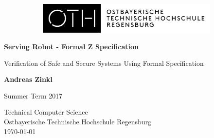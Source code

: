 \begin{titlepage}
    \begin{center}
        \vspace*{1cm}
        
        \begin{figure}[H]
			\centering
			\begin{subfigure}{\textwidth}
  				\centering
  				\includegraphics[width=0.7\linewidth]{images/OTHLogo.jpg}
  				\label{pic:OTHLogo}
			\end{subfigure}%
            \begin{subfigure}{.5\textwidth}
  				\centering
  				
  				\label{pic:HellaLogo}
			\end{subfigure}
		\end{figure}

        
        \vspace{1.7cm}
        
        \Huge
        \textbf{Serving Robot - Formal Z Specification}
        
        \vspace{0.5cm}
        \LARGE
        Verification of Safe and Secure Systems Using Formal Specification
        
        \vspace{3cm}
        
        \textbf{Andreas Zinkl}\\
        \Large
        
        \vspace{1.7cm}
       
        \vfill
        
        Summer Term 2017
        
        \vspace{0.8cm}
          \Large
        Technical Computer Science\\
        Ostbayerische Technische Hochschule Regensburg\\
       \today
        
    \end{center}
\end{titlepage}
